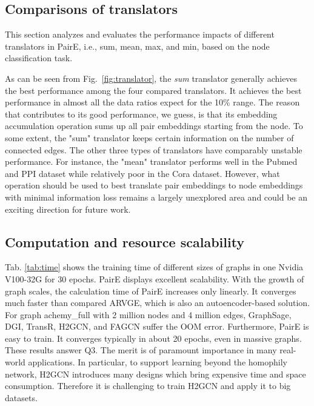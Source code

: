 \documentclass[10pt,journal,compsoc]{IEEEtran}
\begin{document}
\subsection{Comparisons of translators}
\label{sec:translator}
This section analyzes and evaluates the performance impacts of different translators in PairE, i.e., sum, mean, max, and min, based on the node classification task. 



As can be seen from Fig.~\ref{fig:translator}, the \textit{sum} translator generally achieves the best performance among the four compared translators. It achieves the best performance in almost all the data ratios expect for the 10\% range. The reason that contributes to its good performance, we guess, is that its embedding accumulation operation sums up all pair embeddings starting from the node. To some extent, the "sum" translator keeps certain information on the number of connected edges. The other three types of translators have comparably unstable performance. For instance, the "mean" translator performs well in the Pubmed and PPI dataset while relatively poor in the Cora dataset. However, what operation should be used to best translate pair embeddings to node embeddings with minimal information loss remains a largely unexplored area and could be an exciting direction for future work. 

\subsection{Computation and resource scalability}
Tab. \ref{tab:time} shows the training time of different sizes of graphs in one Nvidia V100-32G for 30 epochs. PairE displays excellent scalability. With the growth of graph scales, the calculation time of PairE increases only linearly. It converges much faster than compared ARVGE, which is also an autoencoder-based solution. For graph achemy\_full with 2 million nodes and 4 million edges, GraphSage, DGI, TransR, H2GCN, and FAGCN suffer the OOM error. Furthermore, PairE is easy to train. It converges typically in about 20 epochs, even in massive graphs. These results answer Q3. The merit is of paramount importance in many real-world applications.
In particular, to support learning beyond the homophily network, H2GCN introduces many designs which bring expensive time and space consumption. Therefore it is challenging to train H2GCN and apply it to big datasets.
\end{document}
